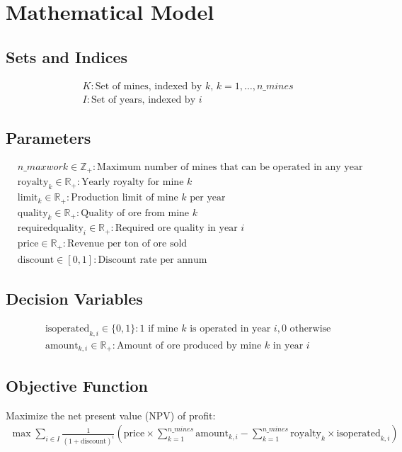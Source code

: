 \documentclass{article}
\begin{document}
\section*{Mathematical Model}

\subsection*{Sets and Indices}
\begin{align*}
& K: \text{Set of mines, indexed by } k, \, k = 1, \ldots, n\_mines \\
& I: \text{Set of years, indexed by } i
\end{align*}

\subsection*{Parameters}
\begin{align*}
& n\_maxwork \in \mathbb{Z}_+: \text{Maximum number of mines that can be operated in any year} \\
& \text{royalty}_{k} \in \mathbb{R}_+: \text{Yearly royalty for mine } k \\
& \text{limit}_{k} \in \mathbb{R}_+: \text{Production limit of mine } k \text{ per year} \\
& \text{quality}_{k} \in \mathbb{R}_+: \text{Quality of ore from mine } k \\
& \text{requiredquality}_{i} \in \mathbb{R}_+: \text{Required ore quality in year } i \\
& \text{price} \in \mathbb{R}_+: \text{Revenue per ton of ore sold} \\
& \text{discount} \in [0, 1]: \text{Discount rate per annum}
\end{align*}

\subsection*{Decision Variables}
\begin{align*}
& \text{isoperated}_{k,i} \in \{0, 1\}: \text{1 if mine } k \text{ is operated in year } i, \text{0 otherwise} \\
& \text{amount}_{k,i} \in \mathbb{R}_+: \text{Amount of ore produced by mine } k \text{ in year } i
\end{align*}

\subsection*{Objective Function}
Maximize the net present value (NPV) of profit:
\begin{align*}
\max \sum_{i \in I} \frac{1}{(1 + \text{discount})^i} \left( \text{price} \times \sum_{k=1}^{n\_mines} \text{amount}_{k,i} - \sum_{k=1}^{n\_mines} \text{royalty}_{k} \times \text{isoperated}_{k,i} \right)
\end{align*}
\end{document}
